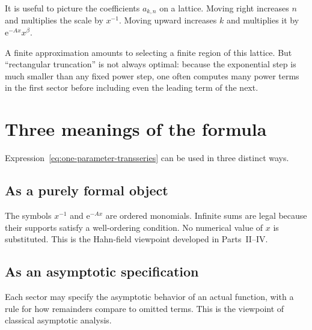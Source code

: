 \documentclass[11pt,oneside]{book}
\theoremstyle{definition}
\theoremstyle{remark}
\newcommand{\e}{\mathrm{e}}
\begin{document}
It is useful to picture the coefficients $a_{k,n}$ on a lattice. Moving right
increases $n$ and multiplies the scale by $x^{-1}$. Moving upward increases $k$
and multiplies it by $\e^{-Ax}x^\beta$.

\begin{center}
\end{center}

A finite approximation amounts to selecting a finite region of this lattice.
But ``rectangular truncation'' is not always optimal: because the exponential
step is much smaller than any fixed power step, one often computes many power
terms in the first sector before including even the leading term of the next.

\section{Three meanings of the formula}

Expression~\eqref{eq:one-parameter-transseries} can be used in three distinct
ways.

\subsection{As a purely formal object}

The symbols $x^{-1}$ and $\e^{-Ax}$ are ordered monomials. Infinite sums are
legal because their supports satisfy a well-ordering condition. No numerical
value of $x$ is substituted. This is the Hahn-field viewpoint developed in
Parts~II--IV.

\subsection{As an asymptotic specification}

Each sector may specify the asymptotic behavior of an actual function, with a
rule for how remainders compare to omitted terms. This is the viewpoint of
classical asymptotic analysis.
\end{document}
